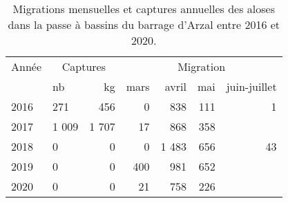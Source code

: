 \begin{table}[htbp]
\centering
\begin{tabular}{llrrrrr}
  \toprule
  Année & \multicolumn{2}{c}{Captures} & \multicolumn{4}{c}{Migration} \\
 & nb & kg & mars & avril & mai & juin-juillet  \\
						 \midrule
2016 & 271 & 456 & 0 & 838 & 111 & 1 \\ 
  2017 & 1 009 & 1 707 & 17 & 868 & 358 &  \\ 
  2018 & 0 & 0 & 0 & 1 483 & 656 & 43 \\ 
  2019 & 0 & 0 & 400 & 981 & 652 &  \\ 
  2020 & 0 & 0 & 21 & 758 & 226 &  \\ 
   \bottomrule
\end{tabular}
\caption{Migrations mensuelles et captures annuelles des aloses dans la passe à bassins 
						du barrage d'Arzal entre 2016 et 2020.} 
\label{table_ala_mois}
\end{table}
